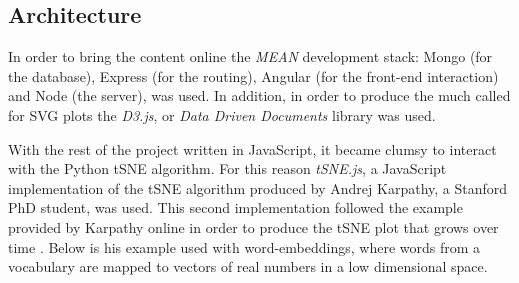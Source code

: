 \documentclass[a4paper,11pt,titlepage]{article}
\begin{document}
	\begin{figure}[H]
    			\centering	
    			\qquad
    			\caption{ }%
    			\label{fig:iter2}
	\end{figure}		
		
	\subsection{Architecture}
	In order to bring the content online the \textit{MEAN} development stack: Mongo (for the database), Express (for the routing), Angular (for the front-end interaction) and Node (the server), was used. In addition, in order to produce the much called for SVG plots the \textit{D3.js}, or \textit{Data Driven Documents} library was used. 
	\par 
	With the rest of the project written in JavaScript, it became clumsy to interact with the Python tSNE algorithm. For this reason \textit{tSNE.js}, a JavaScript implementation of the tSNE algorithm produced by Andrej Karpathy, a Stanford PhD student, was used. This second implementation followed the example provided by Karpathy online in order to produce the tSNE plot that grows over time \cite{karpathy}. Below is his example used with word-embeddings, where words from a vocabulary are mapped to vectors of real numbers in a low dimensional space.
		
\end{document}
